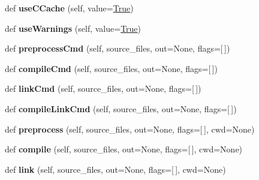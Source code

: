 \begin{DoxyCompactItemize}
def {\bfseries use\+C\+Cache} (self, value=\mbox{\hyperlink{struct_true}{True}})
\item 
\mbox{\label{classlibcxx_1_1compiler_1_1_c_x_x_compiler_a17756d1b6fb5033f13684615aa0f9a37}} 
def {\bfseries use\+Warnings} (self, value=\mbox{\hyperlink{struct_true}{True}})
\item 
\mbox{\label{classlibcxx_1_1compiler_1_1_c_x_x_compiler_a5f1f138aa87514cb2ca6b0b626914d8c}} 
def {\bfseries preprocess\+Cmd} (self, source\+\_\+files, out=None, flags=\mbox{[}$\,$\mbox{]})
\item 
\mbox{\label{classlibcxx_1_1compiler_1_1_c_x_x_compiler_ad23427b98b6d1a908d7ca5bef9e242b6}} 
def {\bfseries compile\+Cmd} (self, source\+\_\+files, out=None, flags=\mbox{[}$\,$\mbox{]})
\item 
\mbox{\label{classlibcxx_1_1compiler_1_1_c_x_x_compiler_a1bdc99a65bac8a9d2353e740c4b1f7c7}} 
def {\bfseries link\+Cmd} (self, source\+\_\+files, out=None, flags=\mbox{[}$\,$\mbox{]})
\item 
\mbox{\label{classlibcxx_1_1compiler_1_1_c_x_x_compiler_a9cc1fabe3f8b3af801c83f8da34bf23d}} 
def {\bfseries compile\+Link\+Cmd} (self, source\+\_\+files, out=None, flags=\mbox{[}$\,$\mbox{]})
\item 
\mbox{\label{classlibcxx_1_1compiler_1_1_c_x_x_compiler_a15fa944e59e041491bbf5cae0689ac91}} 
def {\bfseries preprocess} (self, source\+\_\+files, out=None, flags=\mbox{[}$\,$\mbox{]}, cwd=None)
\item 
\mbox{\label{classlibcxx_1_1compiler_1_1_c_x_x_compiler_a83ef62538f99cb667021fb808a4da9d5}} 
def {\bfseries compile} (self, source\+\_\+files, out=None, flags=\mbox{[}$\,$\mbox{]}, cwd=None)
\item 
\mbox{\label{classlibcxx_1_1compiler_1_1_c_x_x_compiler_abad4870589c3b04bd8a0563721b4a216}} 
def {\bfseries link} (self, source\+\_\+files, out=None, flags=\mbox{[}$\,$\mbox{]}, cwd=None)

\end{DoxyCompactItemize}
